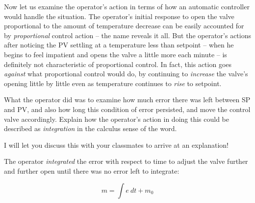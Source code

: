 \vskip 10pt

Now let us examine the operator's action in terms of how an automatic controller would handle the situation.  The operator's initial response to open the valve proportional to the amount of temperature decrease can be easily accounted for by {\it proportional} control action -- the name reveals it all.  But the operator's actions after noticing the PV settling at a temperature less than setpoint -- when he begins to feel impatient and opens the valve a little more each minute -- is definitely not characteristic of proportional control.  In fact, this action goes {\it against} what proportional control would do, by continuing to {\it increase} the valve's opening little by little even as temperature continues to {\it rise} to setpoint.

What the operator did was to examine how much error there was left between SP and PV, and also how long this condition of error persisted, and move the control valve accordingly.  Explain how the operator's action in doing this could be described as {\it integration} in the calculus sense of the word.







I will let you discuss this with your classmates to arrive at an explanation!







The operator {\it integrated} the error with respect to time to adjust the valve further and further open until there was no error left to integrate:

$$m = \int e \> dt + m_0$$




